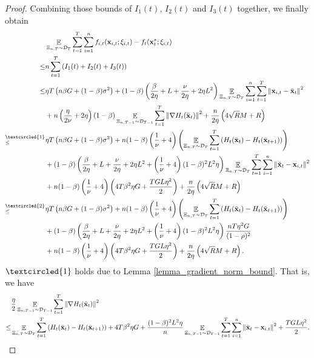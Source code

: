 \documentclass{article}
\begin{document}
\begin{proof}
Combining those bounds of $I_1(t)$, $I_2(t)$ and $I_3(t)$ together, we finally obtain
\begin{align}
\nonumber
& \EE_{ \Xi_{n,T} \sim \Dcal_{T} } \sum_{t=1}^T\sum_{i=1}^n f_{i,t}(\x_{i,t};\xi_{i,t}) - f_t(\x_t^\ast;\xi_{i,t}) \\ \nonumber
\le & n \sum_{t=1}^T \lrincir{ I_1(t) + I_2(t) + I_3(t) } \\ \nonumber
\le & \eta T \lrincir{ n\beta G + (1-\beta)\sigma^2} + (1-\beta)\lrincir{\frac{\beta}{2\eta } +L + \frac{\nu}{2\eta} + 2\eta L^2 } \EE_{ \Xi_{n,T} \sim \Dcal_{T} }\sum_{i=1}^n \sum_{t=1}^T \lrnorm{\x_{i,t} - \bar{\x}_t}^2  \\ \nonumber
& + n\lrincir{ \frac{\eta}{2\nu} + 2\eta }(1-\beta)\EE_{ \Xi_{n,T-1} \sim \Dcal_{T-1} }\sum_{t=1}^T\lrnorm{\nabla H_t(\bar{\x}_t)}^2  + \frac{n}{2\eta}\lrincir{ 4\sqrt{R}M + R  } \\ \nonumber
\refabovecir{\le}{\textcircled{1}} & \eta T \lrincir{ n\beta G + (1-\beta)\sigma^2} + n(1-\beta)\lrincir{ \frac{1}{\nu} + 4 } \lrincir{ \EE_{ \Xi_{n,T} \sim \Dcal_{T} } \sum_{t=1}^T  \lrincir{H_t(\bar{\x}_t) - H_t(\bar{\x}_{t+1})}  } \\ \nonumber
& + (1-\beta)\lrincir{\frac{\beta}{2\eta } +L + \frac{\nu}{2\eta} + 2\eta L^2  + \lrincir{\frac{1}{\nu} + 4}(1-\beta)^2L^2 \eta}  \EE_{ \Xi_{n,T} \sim \Dcal_{T} }\sum_{t=1}^T\sum_{i=1}^n \lrnorm{ \bar{\x}_t - \x_{i,t} }^2  \\ \nonumber
& + n(1-\beta)\lrincir{ \frac{1}{\nu} + 4 } \lrincir{ 4T\beta^2 \eta G + \frac{TGL\eta^2}{2} }  + \frac{n}{2\eta}\lrincir{ 4\sqrt{R}M + R  }\\ \nonumber
\refabovecir{\le}{\textcircled{2}} & \eta T \lrincir{ n\beta G + (1-\beta)\sigma^2} + n(1-\beta)\lrincir{ \frac{1}{\nu} + 4 } \lrincir{ \EE_{ \Xi_{n,T} \sim \Dcal_{T} } \sum_{t=1}^T  \lrincir{H_t(\bar{\x}_t) - H_t(\bar{\x}_{t+1})}  } \\ \nonumber
& + (1-\beta)\lrincir{\frac{\beta}{2\eta } +L + \frac{\nu}{2\eta} + 2\eta L^2  + \lrincir{\frac{1}{\nu} + 4}(1-\beta)^2L^2 \eta}  \frac{nT\eta^2 G }{(1-\rho)^2}  \\ \nonumber
& + n(1-\beta)\lrincir{ \frac{1}{\nu} + 4 } \lrincir{ 4T\beta^2 \eta G + \frac{TGL\eta^2}{2} }  + \frac{n}{2\eta}\lrincir{ 4\sqrt{R}M + R  }.
\end{align}  
$\textcircled{1}$ holds due to Lemma \ref{lemma_gradient_norm_bound}. That is, we have
\begin{align}
& \frac{\eta}{2} \mathop{\mathbb{E}}_{ \Xi_{n,T-1} \sim \mathcal{D}_{T-1} }\sum_{t=1}^T \left\lVert\nabla H_t(\bar{{\bf x}}_t)\right\rVert^2 \\ \nonumber
\le & \mathop{\mathbb{E}}_{ \Xi_{n,T} \sim \mathcal{D}_{T} } \sum_{t=1}^T  \left( H_t(\bar{{\bf x}}_t) - H_t(\bar{{\bf x}}_{t+1}) \right) + 4T\beta^2 \eta G + \frac{(1-\beta)^2L^2 \eta}{n}\mathop{\mathbb{E}}_{ \Xi_{n,T-1} \sim \mathcal{D}_{T-1} }\sum_{t=1}^T\sum_{i=1}^n \left\lVert \bar{{\bf x}}_t - {\bf x}_{i,t} \right\rVert^2 + \frac{TGL\eta^2}{2}.
\end{align} 


\end{proof}
\end{document}
